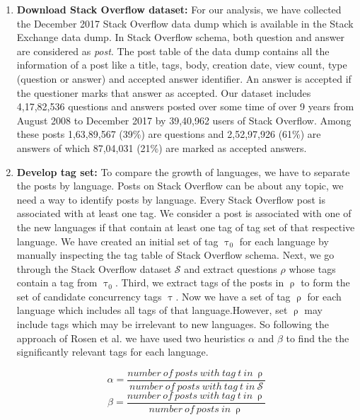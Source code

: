 \begin{enumerate}
    \item \textbf{Download Stack Overflow dataset:} For our analysis, we have collected the December 2017 Stack Overflow data dump which is available in the Stack Exchange data dump. In Stack Overflow schema, both question and answer are considered as \emph{post}. The post table of the data dump contains all the information of a post like a title, tags, body, creation date, view count, type (question or answer) and accepted answer identifier. An answer is accepted if the questioner marks that answer as accepted. Our dataset includes 4,17,82,536 questions and answers posted over some time of over 9 years from August 2008 to December 2017 by 39,40,962 users of Stack Overflow. Among these posts 1,63,89,567 (39\%) are questions and 2,52,97,926 (61\%) are answers of which 87,04,031 (21\%) are marked as accepted answers.
    
 
    \item \textbf{Develop tag set:} To compare the growth of languages, we have to separate the posts by language. Posts on Stack Overflow can be about any topic, we need a way to identify posts by language. Every Stack Overflow post is associated with at least one tag. We consider a post is associated with one of the new languages if that contain at least one tag of tag set of that respective language. We have created an initial set of tag $\uptau_0$ for each language by manually inspecting the tag table of Stack Overflow schema. Next, we go through the Stack Overflow dataset $\mathcal{S}$ and extract questions $\rho$ whose tags contain a tag from  $\uptau_0$. Third, we extract tags of the posts in $\uprho$ to form the set of candidate concurrency tags $\uptau$. Now we have a set of tag $\uprho$ for each language which includes all tags of that language.However, set $\uprho$ may include tags which may be irrelevant to new languages. So following the  approach of Rosen et al.\citep{Rosen2015} we have  used two heuristics $\alpha$ and $\beta$ to find the the significantly relevant tags for each language. 
    
    \begin{equation}
        \alpha = \dfrac{number \ of \ posts \ with \ tag \ t \ in \ \uprho}{number \ of \ posts \ with \ tag \ t \ in \ \mathcal{S}}
    \end{equation}
    \begin{equation}
         \beta = \dfrac{number \ of \ posts \ with \ tag \ t \ in \ \uprho}{number \ of \ posts \ in \ \uprho}
    \end{equation}


\end{enumerate}
